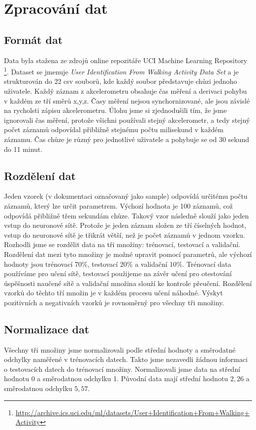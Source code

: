 \documentclass[a4paper, 10pt]{article}
\begin{document}
\section{Zpracování dat}
      \begin{multicols}{2}
    \subsection{Formát dat}
        Data byla stažena ze zdrojů online repozitáře UCI Machine Learning Repository \footnote{\url{http://archive.ics.uci.edu/ml/datasets/User+Identification+From+Walking+Activity}}. Dataset se jmenuje \textit{User Identification From Walking Activity Data Set}  a je strukturován do 22 csv souborů, kde každý soubor představuje chůzi jednoho uživatele. Každý záznam z akcelerometru obsahuje čas měření a derivaci pohybu v každém ze tří směrů x,y,z. Časy měření nejsou synchornizované, ale jsou závislé na rycholsti zápisu akcelerometru. Úlohu jsme si zjednodušili tím, že jsme ignorovali čas měření, protože všichni používali stejný akcelerometr, a tedy stejný počet záznamů odpovídal přibližně stejnému počtu milisekund v každém záznamu. Čas chůze je různý pro jednotlivé uživatele a pohybuje se od 30 sekund do 11 minut.
    \subsection{Rozdělení dat}
        Jeden vzorek (v dokumentaci označovaný jako sample) odpovídá určitému počtu záznamů, který lze určit parametrem. Výchozí hodnota je 100 záznamů, což odpovídá přibližně třem sekundám chůze. Takový vzor následně slouží jako jeden vstup do neuronové sítě. Protože je jeden záznam složen ze tří číselných hodnot, vstup do neuronové sítě je třikrát větší, než je počet záznamů v jednom vzorku.
        Rozhodli jsme se rozdělit data na tři množiny: trénovací, testovací a validační. Rozdělení dat mezi tyto množiny je možné upravit pomocí parametrů, ale výchozí hodnoty jsou trénovací 70\%, testovací 20\% a validační 10\%. Trénovací data používáme pro učení sítě, testovací použijeme na závěr učení pro otestování úspěšnosti naučené sítě a validační množina slouží ke kontrole přeučení. Rozdělení vzorků do těchto tří množin je v každém procesu učení náhodné. Výskyt pozitivních a negativních vzorků je rovnoměrný pro všechny tři množiny.
      
    \subsection{Normalizace dat}
        Všechny tři množiny jsme normalizovali podle střední hodnoty a směrodatné odchylky naměřené v trénovacích datech. Takto jsme nezavedli žádnou informaci o testovacích datech do trénovací množiny. Normalizovali jsme data na střední hodnotu 0 a směrodatnou odchylku 1. Původní data mají střední hodnotu $2,26$ a směrodatnou odchylku $5,57$.
      \end{multicols}
\end{document}
